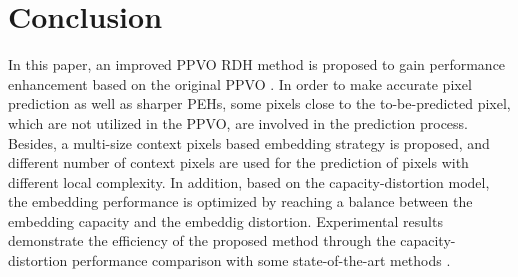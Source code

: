 \documentclass[review,3p,10pt,sort&compress]{elsarticle}
\begin{document}

\section{Conclusion}\label{sec:5}
In this paper, an improved PPVO RDH method is proposed to gain performance enhancement based on the original PPVO \cite{Qu2015PPVO}. In order to make accurate pixel prediction as well as sharper PEHs, some pixels close to the to-be-predicted pixel, which are not utilized in the PPVO, are involved in the prediction process. Besides, a multi-size context pixels based embedding strategy is proposed, and different number of context pixels are used for the prediction of pixels with different local complexity. In addition, based on the capacity-distortion model, the embedding performance is optimized by reaching a balance between the embedding capacity and the embeddig distortion. Experimental results demonstrate the efficiency of the proposed method through the capacity-distortion performance comparison with some state-of-the-art methods \cite{Peng2014IPVO,Ou2014PVOk,Qu2015PPVO}.
\end{document}
